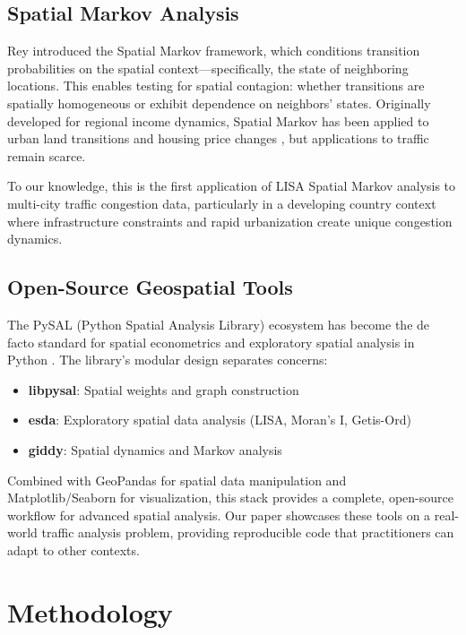 \documentclass[11pt,a4paper]{article}
\begin{document}
\subsection{Spatial Markov Analysis}

Rey \cite{rey2001} introduced the Spatial Markov framework, which conditions transition probabilities on the spatial context---specifically, the state of neighboring locations. This enables testing for spatial contagion: whether transitions are spatially homogeneous or exhibit dependence on neighbors' states. Originally developed for regional income dynamics, Spatial Markov has been applied to urban land transitions \cite{zheng2013} and housing price changes \cite{chegut2015}, but applications to traffic remain scarce.

To our knowledge, this is the first application of LISA Spatial Markov analysis to multi-city traffic congestion data, particularly in a developing country context where infrastructure constraints and rapid urbanization create unique congestion dynamics.

\subsection{Open-Source Geospatial Tools}

The PySAL (Python Spatial Analysis Library) ecosystem has become the de facto standard for spatial econometrics and exploratory spatial analysis in Python \cite{rey2007,rey2021}. The library's modular design separates concerns:
\begin{itemize}
    \item \textbf{libpysal}: Spatial weights and graph construction
    \item \textbf{esda}: Exploratory spatial data analysis (LISA, Moran's I, Getis-Ord)
    \item \textbf{giddy}: Spatial dynamics and Markov analysis
\end{itemize}

Combined with GeoPandas \cite{jordahl2020} for spatial data manipulation and Matplotlib/Seaborn for visualization, this stack provides a complete, open-source workflow for advanced spatial analysis. Our paper showcases these tools on a real-world traffic analysis problem, providing reproducible code that practitioners can adapt to other contexts.

\section{Methodology}
\end{document}
